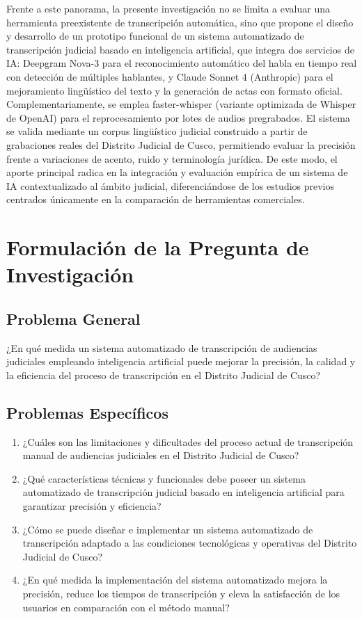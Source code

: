 \documentclass[12pt,a4paper,oneside]{report}
\begin{document}
Frente a este panorama, la presente investigación no se limita a evaluar una herramienta preexistente de transcripción automática, sino que propone el diseño y desarrollo de un prototipo funcional de un sistema automatizado de transcripción judicial basado en inteligencia artificial, que integra dos servicios de IA: Deepgram Nova-3 para el reconocimiento automático del habla en tiempo real con detección de múltiples hablantes, y Claude Sonnet 4 (Anthropic) para el mejoramiento lingüístico del texto y la generación de actas con formato oficial. Complementariamente, se emplea faster-whisper (variante optimizada de Whisper de OpenAI) para el reprocesamiento por lotes de audios pregrabados. El sistema se valida mediante un corpus lingüístico judicial construido a partir de grabaciones reales del Distrito Judicial de Cusco, permitiendo evaluar la precisión frente a variaciones de acento, ruido y terminología jurídica. De este modo, el aporte principal radica en la integración y evaluación empírica de un sistema de IA contextualizado al ámbito judicial, diferenciándose de los estudios previos centrados únicamente en la comparación de herramientas comerciales.

\section{Formulación de la Pregunta de Investigación}

\subsection{Problema General}

¿En qué medida un sistema automatizado de transcripción de audiencias judiciales empleando inteligencia artificial puede mejorar la precisión, la calidad y la eficiencia del proceso de transcripción en el Distrito Judicial de Cusco?

\subsection{Problemas Específicos}

\begin{enumerate}[label=\alph*)]
  \item ¿Cuáles son las limitaciones y dificultades del proceso actual de transcripción manual de audiencias judiciales en el Distrito Judicial de Cusco?
  \item ¿Qué características técnicas y funcionales debe poseer un sistema automatizado de transcripción judicial basado en inteligencia artificial para garantizar precisión y eficiencia?
  \item ¿Cómo se puede diseñar e implementar un sistema automatizado de transcripción adaptado a las condiciones tecnológicas y operativas del Distrito Judicial de Cusco?
  \item ¿En qué medida la implementación del sistema automatizado mejora la precisión, reduce los tiempos de transcripción y eleva la satisfacción de los usuarios en comparación con el método manual?
\end{enumerate}
\end{document}
